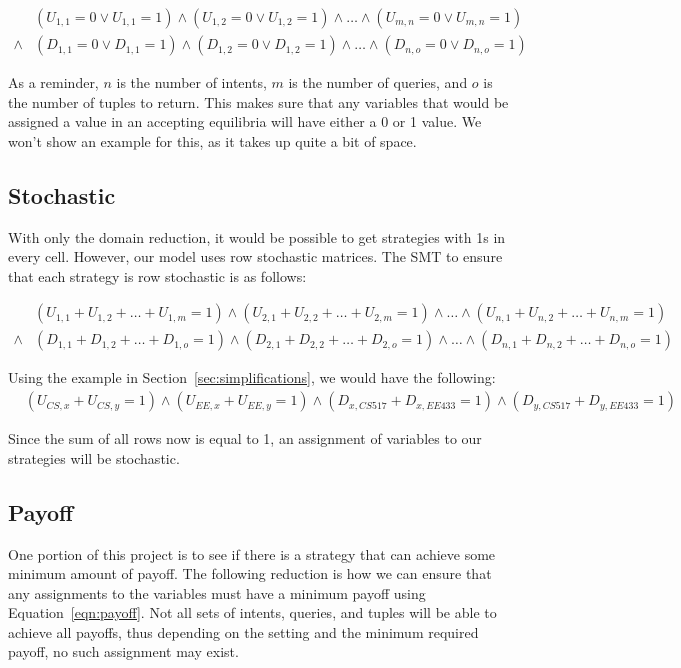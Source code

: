 \documentclass{article}
\begin{document}
\begin{align}
\label{eqn:domain}
&(U_{1,1} = 0\lor U_{1,1} = 1)\land(U_{1,2} = 0\lor U_{1,2} = 1)\land\ldots\land(U_{m,n} = 0\lor U_{m,n} = 1)\\
\land&(D_{1,1} = 0\lor D_{1,1} = 1)\land(D_{1,2} = 0\lor D_{1,2} = 1)\land\ldots\land(D_{n,o} = 0\lor D_{n,o} = 1)\nonumber
\end{align}

As a reminder, $n$ is the number of intents, $m$ is the number of queries, and $o$ is the number of tuples to return. This makes sure that any variables that would be assigned a value in an accepting equilibria will have either a 0 or 1 value. We won't show an example for this, as it takes up quite a bit of space.

\subsection{Stochastic}
With only the domain reduction, it would be possible to get strategies with 1s in every cell. However, our model uses row stochastic matrices. The SMT to ensure that each strategy is row stochastic is as follows:

\begin{align}
\label{eqn:stochastic}
&(U_{1,1} + U_{1,2} + \ldots + U_{1,m}=1)\land(U_{2,1} + U_{2,2} + \ldots + U_{2,m}=1)\land\ldots\land(U_{n,1} + U_{n,2} + \ldots + U_{n,m}=1)\\
\land&(D_{1,1} + D_{1,2} + \ldots + D_{1,o}=1)\land(D_{2,1} + D_{2,2} + \ldots + D_{2,o}=1)\land\ldots\land(D_{n,1} + D_{n,2} + \ldots + D_{n,o}=1)\nonumber
\end{align}

Using the example in Section~\ref{sec:simplifications}, we would have the following:
\begin{align}
\label{eqn:stochastic:example}
&(U_{CS,x} + U_{CS,y}=1)\land(U_{EE,x} + U_{EE,y}=1)\land(D_{x,CS517} + D_{x,EE433}=1)\land(D_{y,CS517} + D_{y,EE433}=1)
\end{align}

Since the sum of all rows now is equal to 1, an assignment of variables to our strategies will be stochastic.

\subsection{Payoff}
\label{sec:payoff}
One portion of this project is to see if there is a strategy that can achieve some minimum amount of payoff. The following reduction is how we can ensure that any assignments to the variables must have a minimum payoff using Equation~\ref{eqn:payoff}. Not all sets of intents, queries, and tuples will be able to achieve all payoffs, thus depending on the setting and the minimum required payoff, no such assignment may exist.
\end{document}
